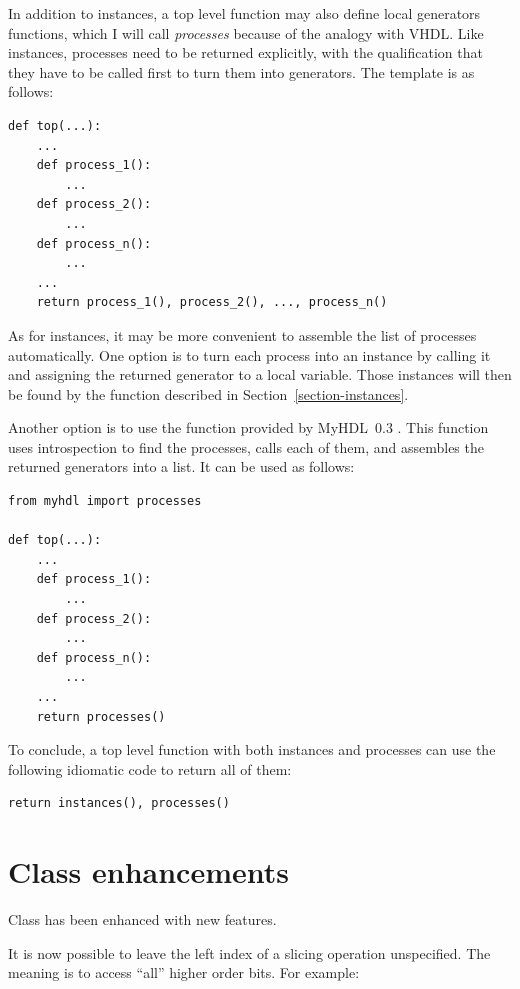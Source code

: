 \documentclass{howto}
\newcommand{\myhdl}{\protect \mbox{MyHDL}}
\begin{document}
In addition to instances, a top level function may
also define local generators functions, which I will
call \emph{processes} because of the analogy with VHDL.
Like instances, processes need to be returned explicitly,
with the qualification that they have to be called first
to turn them into generators. The template is as follows:

\begin{verbatim}
def top(...):
    ...
    def process_1():
        ...
    def process_2():
        ...
    def process_n():
        ...
    ...
    return process_1(), process_2(), ..., process_n()
\end{verbatim}

As for instances, it may be more convenient to assemble the list of
processes automatically. One option is to turn each process into an
instance by calling it and assigning the returned generator to a local
variable. Those instances will then be found by the
 function described in
Section~\ref{section-instances}.

Another option is to use the function  provided
by \myhdl\ 0.3 . This function uses introspection to find the
processes, calls each of them, and assembles the returned generators
into a list. It can be used as follows:

\begin{verbatim}
from myhdl import processes

def top(...):
    ...
    def process_1():
        ...
    def process_2():
        ...
    def process_n():
        ...
    ... 
    return processes()
\end{verbatim}

To conclude, a top level function with both instances and processes
can use the following idiomatic code to return all of them:

\begin{verbatim}
return instances(), processes()
\end{verbatim}

\section{Class  enhancements\label{section-intbv}}

Class  has been enhanced with new features.

It is now possible to leave the left index of a slicing operation
unspecified. The meaning is to access ``all'' higher order bits. For
example:
\end{document}
